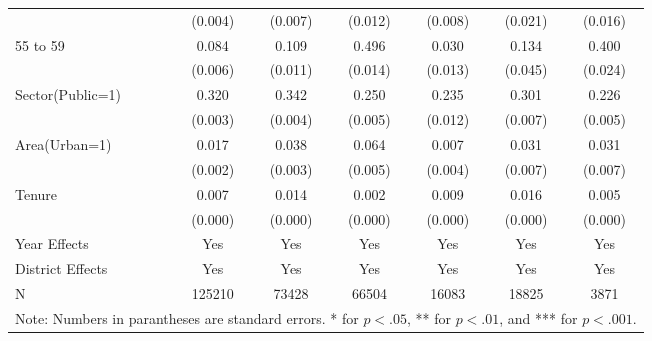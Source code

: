 \documentclass[12pt,author-year]{article}
\begin{document}
\begin{table}[H]
{{\begin{tabular}{l*{6}{c}}
				&  (0.004)         &  (0.007)         &  (0.012)         &  (0.008)         &  (0.021)         &  (0.016)         \\
				55 to 59            &    0.084\sym{***}&    0.109\sym{***}&    0.496\sym{***}&    0.030\sym{*}  &    0.134\sym{**} &    0.400\sym{***}\\
				&  (0.006)         &  (0.011)         &  (0.014)         &  (0.013)         &  (0.045)         &  (0.024)         \\
				Sector(Public=1)       &    0.320\sym{***}&    0.342\sym{***}&    0.250\sym{***}&    0.235\sym{***}&    0.301\sym{***}&    0.226\sym{***}\\
				&  (0.003)         &  (0.004)         &  (0.005)         &  (0.012)         &  (0.007)         &  (0.005)         \\
				Area(Urban=1)           &    0.017\sym{***}&    0.038\sym{***}&    0.064\sym{***}&    0.007         &    0.031\sym{***}&    0.031\sym{***}\\
				&  (0.002)         &  (0.003)         &  (0.005)         &  (0.004)         &  (0.007)         &  (0.007)         \\
				Tenure              &    0.007\sym{***}&    0.014\sym{***}&    0.002\sym{***}&    0.009\sym{***}&    0.016\sym{***}&    0.005\sym{***}\\
				&  (0.000)         &  (0.000)         &  (0.000)         &  (0.000)         &  (0.000)         &  (0.000)         \\
				\midrule
				Year Effects        &       Yes           &          Yes        &       Yes           &          Yes        &           Yes       &      Yes            \\
				District Effects        &       Yes           &          Yes        &       Yes           &          Yes        &           Yes       &      Yes            \\
				N                   &  125210         &  73428         &  66504         &  16083         &  18825         &  3871         \\
				\bottomrule
				\multicolumn{7}{l}{\footnotesize Note: Numbers in parantheses are standard errors. * for $p<.05$, ** for $p<.01$, and *** for $p<.001$.}\\
	\end{tabular}}}
\end{table}
\fi 

\pagebreak

\renewcommand{\thefigure}{A\arabic{figure}} 
\setcounter{figure}{0}   
\end{document}
